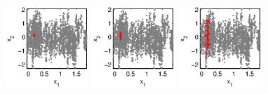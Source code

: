 \begin{figure}[!t]
\centering
\def \figwidth {0.28\textwidth}
\includegraphics[width=\figwidth]{data_linear_burst1}
\includegraphics[width=\figwidth]{data_linear_burst2}
\includegraphics[width=\figwidth]{data_linear_burst3}


\end{figure}
